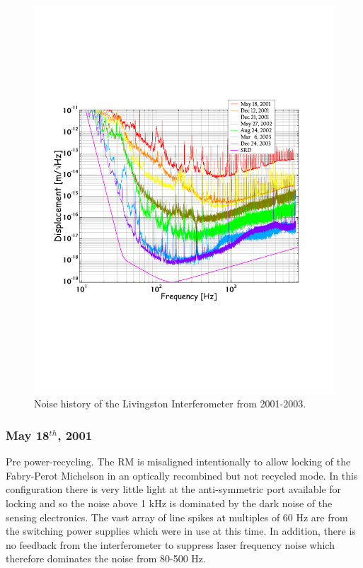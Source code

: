\begin{figure}[!h]
\centerline{
\includegraphics[angle=-90,width=6.5in]{Figures/Chap4/NoiseHist.pdf}}
\caption[LLO Noise History]{Noise history of the Livingston Interferometer from
                            2001-2003.}
\label{fig:NoiseHist}
\end{figure}


\subsubsection{May 18$^{th}$, 2001}

Pre power-recycling. The RM is misaligned intentionally to allow locking of
the Fabry-Perot Michelson in an optically recombined but not recycled mode. 
In this configuration there is very little
light at the anti-symmetric port available for locking and so the noise above
1 kHz is dominated by the dark noise of the sensing electronics. The vast array
of line spikes at multiples of 60 Hz are from the switching power supplies which were
in use at this time. In addition, there is no feedback from the interferometer 
to suppress laser frequency noise which therefore dominates the noise from 80-500 Hz.


